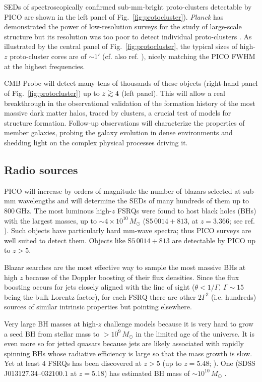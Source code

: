 \documentclass[11pt,a4paper]{article}
\def\simgt{\mathrel{\rlap{\lower 3pt\hbox{$\sim$}} \raise2.0pt\hbox{$>$}}}
\begin{document}
SEDs of spectroscopically confirmed sub-mm-bright proto-clusters detectable by PICO are shown in the left panel of Fig.~\ref{fig:protocluster}). \textit{Planck} has demonstrated the power of low-resolution surveys for the study of large-scale structure  \cite{Planck2016high_z} but its resolution was too poor to detect individual proto-clusters \cite{Negrello2017protocl}.
As illustrated by the central panel of Fig.~\ref{fig:protocluster}, the typical sizes of high-$z$ proto-cluster cores are of $\sim 1'$ (cf. also ref. \cite{Alberts2014}), nicely matching the PICO FWHM at the highest frequencies.

CMB Probe will detect many tens of thousands of these objects (right-hand panel of Fig.~\ref{fig:protocluster}) up to $z\simgt 4$ (left panel). This will allow a real breakthrough in the observational validation of the formation history of the most massive dark matter halos, traced by clusters, a crucial test of models for structure formation. Follow-up observations will characterize the properties of member galaxies, probing the galaxy evolution in dense environments and shedding light on the complex physical processes driving it.

\subsection{Radio sources}

PICO will increase by orders of magnitude the number of blazars selected at sub-mm wavelengths and will determine the SEDs of many hundreds of them up to 800\,GHz. The most luminous high-$z$ FSRQs were found to host black holes (BHs) with the largest masses, up to $\sim 4\times 10^{10}\,M_\odot$ (S$5\,0014+813$, at  $z = 3.366$; see ref. \cite{Ghisellini2009}). Such objects have particularly hard mm-wave spectra; thus PICO surveys are well suited to detect them. Objects like S$5\,0014+813$ are detectable by PICO up to $z>5$.

Blazar searches are the most effective way to sample the most massive BHs at high $z$ because of the Doppler boosting of their flux densities. Since the flux boosting occurs for jets closely aligned with the line of sight ($\theta < 1/\Gamma$, $\Gamma \sim 15$ being the bulk Lorentz factor), for each FSRQ there are other $2\Gamma^2$  (i.e. hundreds) sources of similar intrinsic properties but pointing elsewhere.

Very large BH masses at high-$z$ challenge models because it is very hard to grow a seed BH from stellar mass to $> 10^9\,M_\odot$ in the limited age of the universe. It is even more so for jetted quasars because jets are likely associated with rapidly spinning BHs whose radiative efficiency is large so that the mass growth is slow. Yet at least 4 FSRQs has been discovered at $z>5$ (up to $z=5.48$; \cite{Romani2004}). One (SDSS J$013127.34–032100.1$ at $z = 5.18$) has estimated BH mass of $\sim 10^{10}\,M_\odot$ \cite{Ghisellini2015}.
\end{document}
